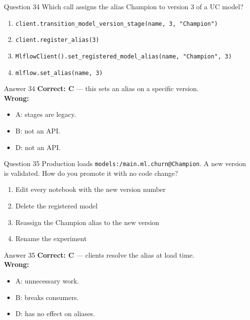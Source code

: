 \documentclass[aspectratio=169,11pt]{beamer}
\begin{document}
	\begin{frame}{Question 34}
		Which call assigns the alias Champion to version 3 of a UC model?
		\begin{enumerate}[label=\Alph*.]
			\item \texttt{client.transition\_model\_version\_stage(name, 3, "Champion")}
			\item \texttt{client.register\_alias(3)}
			\item \texttt{MlflowClient().set\_registered\_model\_alias(name, "Champion", 3)}
			\item \texttt{mlflow.set\_alias(name, 3)}
		\end{enumerate}
	\end{frame}
	\begin{frame}{Answer 34}
		\textbf{Correct: C} --- this sets an alias on a specific version.\\
		\vspace{0.5em}
		\textbf{Wrong:}
		\begin{itemize}
			\item A: stages are legacy.
			\item B: not an API.
			\item D: not an API.
		\end{itemize}
	\end{frame}
	
	\begin{frame}{Question 35}
		Production loads \texttt{models:/main.ml.churn@Champion}. A new version is validated. How do you promote it with no code change?
		\begin{enumerate}[label=\Alph*.]
			\item Edit every notebook with the new version number
			\item Delete the registered model
			\item Reassign the Champion alias to the new version
			\item Rename the experiment
		\end{enumerate}
	\end{frame}
	\begin{frame}{Answer 35}
		\textbf{Correct: C} --- clients resolve the alias at load time.\\
		\vspace{0.5em}
		\textbf{Wrong:}
		\begin{itemize}
			\item A: unnecessary work.
			\item B: breaks consumers.
			\item D: has no effect on aliases.
		\end{itemize}
	\end{frame}
	
\end{document}
